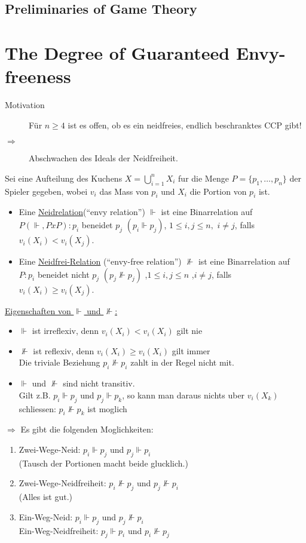 \newpage
\subsection{Preliminaries of Game Theory}

\pagebreak
\section{The Degree of Guaranteed Envy-freeness}
\begin{description}
 \item[Motivation] Für $n\geq4$ ist es offen, ob es ein neidfreies, endlich beschranktes CCP gibt!
 \item[$\Rightarrow$] Abschwachen des Ideals der Neidfreiheit. 
\end{description}
\begin{defi}
 Sei eine Aufteilung des Kuchens $X=\bigcup\limits_{i=1}^n X_i$ fur die Menge $P=\{p_1,\dots,p_n\}$ der Spieler gegeben, wobei $v_i$
 das Mass von $p_i$ und $X_i$ die Portion von $p_i$ ist.
 \begin{itemize}
  \item Eine \underline{Neidrelation}(``envy relation'') $\Vdash$ ist eine Binarrelation auf $P(\Vdash, PxP):p_i$ beneidet 
        $p_j$ $(p_i\Vdash p_j)$, $1\leq i,j\leq n,$ $i\neq j$, falls $v_i(X_i)<v_i(X_j)$.
  \item Eine \underline{Neidfrei-Relation} (``envy-free relation'') $\nVdash$ ist eine Binarrelation auf $P:p_i$ beneidet nicht $p_j$ $(p_j
        \nVdash p_j)$ ,$1\leq i,j\leq n$ ,$i\neq j$, falls $v_i(X_i)\geq v_i(X_j)$.
 \end{itemize}
\end{defi}
\underline{Eigenschaften von $\Vdash$ und $\nVdash$:}
\begin{itemize}
 \item $\Vdash$ ist irreflexiv, denn $v_i(X_i)<v_i(X_i)$ gilt nie
 \item $\nVdash$ ist reflexiv, denn $v_i(X_i)\geq v_i(X_i)$ gilt immer\\Die triviale Beziehung $p_i \nVdash p_i$ zahlt in der Regel nicht
       mit.
 \item $\Vdash$ und $\nVdash$ sind nicht transitiv.\\
       Gilt z.B. $p_i\Vdash p_j$ und $p_j\Vdash p_k$, so kann man daraus nichts uber $v_i(X_k)$ schliessen: $p_i\nVdash p_k$ ist moglich
\end{itemize}
$\Rightarrow$ Es gibt die folgenden Moglichkeiten:
\begin{enumerate}
 \item Zwei-Wege-Neid: $p_i\Vdash p_j$ und $p_j\Vdash p_i$\\(Tausch der Portionen macht beide glucklich.)
 \item Zwei-Wege-Neidfreiheit: $p_i\nVdash p_j$ und $p_j\nVdash p_i$\\(Alles ist gut.)
 \item Ein-Weg-Neid: $p_i\Vdash p_j$ und $p_j\nVdash p_i$\\
       Ein-Weg-Neidfreiheit: $p_j\Vdash p_i$ und $p_i\nVdash p_j$
\end{enumerate}

